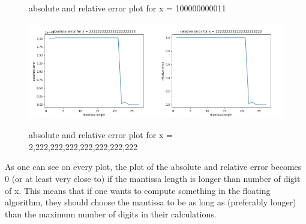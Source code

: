 \begin{figure}[p]
    \caption{absolute and relative error plot for x = 100000000011}\label{fig:1011}
    \centering
        \includegraphics[width=0.5\textwidth]{graphics/abs2times22}\includegraphics[width=0.5\textwidth]{graphics/rel2times22}
    \caption{absolute and relative error plot for x = 2,222,222,222,222,222,222,222}\label{fig:2times22}
\end{figure}
As one can see on every plot, the plot of the absolute and relative error becomes 0 (or at least very close to) if the mantissa length is longer than number of digit of x. This means that if one wants to compute something in the floating algorithm, they should choose the mantissa to be as long as (preferably longer) than the maximum number of digits in their calculations.